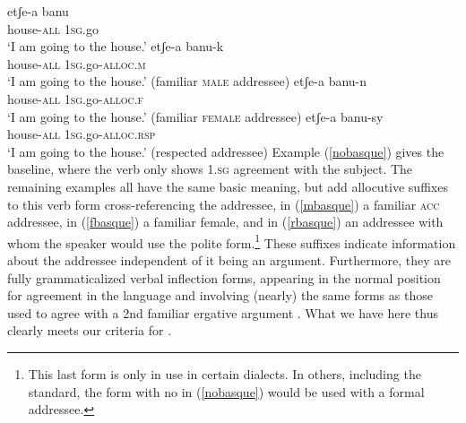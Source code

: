 \documentclass[output=paper, modfonts, nonflat]{langsci/langscibook}
\begin{document}
\ea\label{basque}
  \ea\label{nobasque}\gll etʃe-a banu\\
  house-\textsc{all}{} 1\textsc{sg}.go\\
  \glt `I am going to the house.'
  \ex\label{mbasque}\gll etʃe-a banu-k\\
  house-\textsc{all}{} 1\textsc{sg}.go-\textsc{alloc}.\textsc{m}\\
  \glt `I am going to the house.' (familiar \textsc{male} addressee)
  \ex\label{fbasque}\gll etʃe-a banu-n\\
  house-\textsc{all}{} 1\textsc{sg}.go-\textsc{alloc}.\textsc{f}\\
  \glt `I am going to the house.' (familiar \textsc{female} addressee)
  \ex\label{rbasque}\gll etʃe-a banu-sy\\
  house-\textsc{all}{} 1\textsc{sg}.go-\textsc{alloc}.\textsc{rsp}\\
  \glt `I am going to the house.' (respected addressee)
  \z
\z
%
Example (\ref{nobasque}) gives the baseline, where the verb only shows 1.\textsc{sg}
agreement with the subject. The remaining examples all have the same
basic meaning, but add allocutive suffixes to this verb form
cross-referencing the addressee, in (\ref{mbasque}) a familiar \textsc{acc}
addressee, in (\ref{fbasque}) a familiar female, and in
(\ref{rbasque}) an addressee with whom the speaker would use the
polite form.\footnote{This last form is only in use in certain
  dialects. In others, including the standard, the form with no
  \allagr{} in (\ref{nobasque}) would be used with a formal
  addressee.} These suffixes indicate information about the addressee
independent of it being an argument. Furthermore, they are fully
grammaticalized verbal inflection forms, appearing in the normal
position for agreement in the language and involving (nearly) the same
forms as those used to agree with a 2nd familiar ergative argument
\citep[see][66f. for discussion of the forms]{antonov:2015}. What
we have here thus clearly meets our criteria for \allagr{}.
\end{document}
